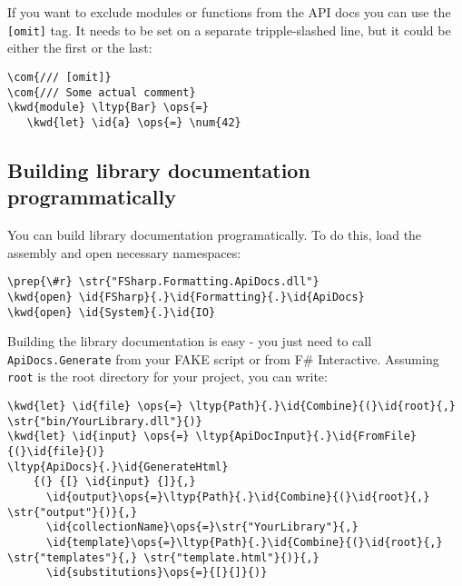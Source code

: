 \documentclass{article}
\newcommand{\id}[1]{\textcolor{black}{#1}}
\newcommand{\com}[1]{\textcolor{officegreen}{#1}}
\newcommand{\kwd}[1]{\textcolor{navy}{#1}}
\newcommand{\num}[1]{\textcolor{officegreen}{#1}}
\newcommand{\ops}[1]{\textcolor{purple}{#1}}
\newcommand{\prep}[1]{\textcolor{purple}{#1}}
\newcommand{\str}[1]{\textcolor{olive}{#1}}
\begin{document}
If you want to exclude modules or functions from the API docs you can use the \texttt{[omit]} tag.
It needs to be set on a separate tripple-slashed line, but it could be either the first or the last:
\begin{Verbatim}[commandchars=\\\{\}]
\com{/// [omit]}
\com{/// Some actual comment}
\kwd{module} \ltyp{Bar} \ops{=} 
   \kwd{let} \id{a} \ops{=} \num{42}
\end{Verbatim}

\subsection*{Building library documentation programmatically}



You can build library documentation programatically. To do this, load the assembly and open necessary namespaces:
\begin{Verbatim}[commandchars=\\\{\}]
\prep{\#r} \str{"FSharp.Formatting.ApiDocs.dll"}
\kwd{open} \id{FSharp}{.}\id{Formatting}{.}\id{ApiDocs}
\kwd{open} \id{System}{.}\id{IO}
\end{Verbatim}



Building the library documentation is easy - you just need to call
\texttt{ApiDocs.Generate} from your FAKE script or from F\# Interactive.
Assuming \texttt{root} is the root directory for your project, you can write:
\begin{Verbatim}[commandchars=\\\{\}]
\kwd{let} \id{file} \ops{=} \ltyp{Path}{.}\id{Combine}{(}\id{root}{,} \str{"bin/YourLibrary.dll"}{)}
\kwd{let} \id{input} \ops{=} \ltyp{ApiDocInput}{.}\id{FromFile}{(}\id{file}{)} 
\ltyp{ApiDocs}{.}\id{GenerateHtml}
    {(} {[} \id{input} {]}{,} 
      \id{output}\ops{=}\ltyp{Path}{.}\id{Combine}{(}\id{root}{,} \str{"output"}{)}{,}
      \id{collectionName}\ops{=}\str{"YourLibrary"}{,}
      \id{template}\ops{=}\ltyp{Path}{.}\id{Combine}{(}\id{root}{,} \str{"templates"}{,} \str{"template.html"}{)}{,}
      \id{substitutions}\ops{=}{[}{]}{)}
\end{Verbatim}
\end{document}
